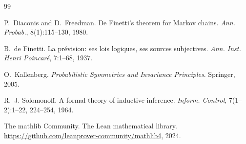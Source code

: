 \documentclass[11pt,a4paper]{article}
\theoremstyle{definition}
\begin{document}
\begin{thebibliography}{99}

P.~Diaconis and D.~Freedman.
\newblock De Finetti's theorem for Markov chains.
\newblock \emph{Ann. Probab.}, 8(1):115--130, 1980.

B.~de Finetti.
\newblock La pr\'evision: ses lois logiques, ses sources subjectives.
\newblock \emph{Ann. Inst. Henri Poincar\'e}, 7:1--68, 1937.

O.~Kallenberg.
\newblock \emph{Probabilistic Symmetries and Invariance Principles}.
\newblock Springer, 2005.

R.~J. Solomonoff.
\newblock A formal theory of inductive inference.
\newblock \emph{Inform. Control}, 7(1--2):1--22, 224--254, 1964.

The mathlib Community.
\newblock The Lean mathematical library.
\newblock \url{https://github.com/leanprover-community/mathlib4}, 2024.

\end{thebibliography}
\end{document}
